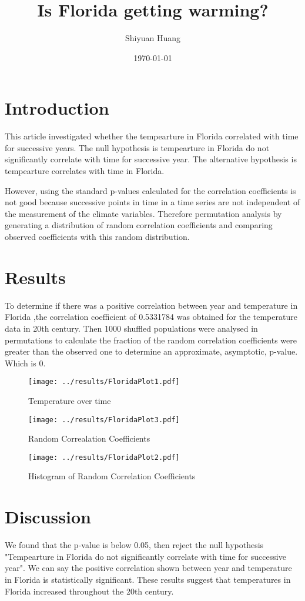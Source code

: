 \documentclass[12pt]{article}
\title{Is Florida getting warming?}
\author{Shiyuan Huang}
\date{\today}
\begin{document}
  \maketitle

  \section{Introduction}
    This article investigated whether the tempearture in Florida correlated with time for successive years. 
    The null hypothesis is tempearture in Florida do not significantly correlate with time for successive year. The alternative hypothesis is tempearture correlates with time in Florida.

    However, using the standard p-values calculated for the correlation coefficients is not good because successive points in time in a time series are not independent of the measurement of the climate variables.
    Therefore permutation analysis by generating a distribution of random correlation coefficients and comparing observed coefficients with this random distribution.

  \section{Results}
    To determine if there was a positive correlation between year and temperature in Florida ,the correlation coefficient of 0.5331784 was obtained for the temperature data in 20th century.
    Then 1000 shuffled populations were analysed in permutations to calculate the fraction of the random correlation coefficients were greater than the observed one to determine an approximate, asymptotic,  p-value. Which is 0.

\begin{figure}[H]
    \centering
    \texttt{[image: ../results/FloridaPlot1.pdf]}
    \caption{Temperature over time}
    \end{figure}
        
\begin{figure}[H]
    \centering
    \texttt{[image: ../results/FloridaPlot3.pdf]}
    \caption{Random Correalation Coefficients}
    \end{figure}
        
\begin{figure}[H]
    \centering
    \texttt{[image: ../results/FloridaPlot2.pdf]}
    \caption{Histogram of Random Correlation Coefficients}
    \end{figure}

\section{Discussion}
We found that the p-value is below 0.05, then reject the null hypothesis "Tempearture in Florida do not significantly correlate with time for successive year". We can say the positive correlation shown between year and temperature in Florida is statistically significant.
These results suggest that temperatures in Florida increased throughout the 20th century.
\end{document}
